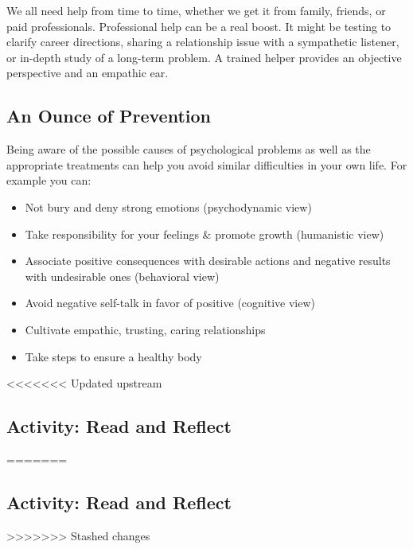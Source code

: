 \documentclass[
]{book}
\providecommand{\tightlist}{%
  \setlength{\itemsep}{0pt}\setlength{\parskip}{0pt}}
\begin{document}
We all need help from time to time, whether we get it from family, friends, or paid professionals. Professional help can be a real boost. It might be testing to clarify career directions, sharing a relationship issue with a sympathetic listener, or in-depth study of a long-term problem. A trained helper provides an objective perspective and an empathic ear.

\hypertarget{an-ounce-of-prevention-1}{%
\subsection*{An Ounce of Prevention}\label{an-ounce-of-prevention-1}}

Being aware of the possible causes of psychological problems as well as the appropriate treatments can help you avoid similar difficulties in your own life. For example you can:

\begin{itemize}
\tightlist
\item
  Not bury and deny strong emotions (psychodynamic view)\\
\item
  Take responsibility for your feelings \& promote growth (humanistic view)\\
\item
  Associate positive consequences with desirable actions and negative results with undesirable ones (behavioral view)\\
\item
  Avoid negative self-talk in favor of positive (cognitive view)\\
\item
  Cultivate empathic, trusting, caring relationships\\
\item
  Take steps to ensure a healthy body
\end{itemize}

<<<<<<< Updated upstream
\hypertarget{activity-read-and-reflect-25}{%
\subsection*{Activity: Read and Reflect}\label{activity-read-and-reflect-25}}
=======
\hypertarget{activity-read-and-reflect-24}{%
\subsection*{Activity: Read and Reflect}\label{activity-read-and-reflect-24}}
>>>>>>> Stashed changes
\end{document}
